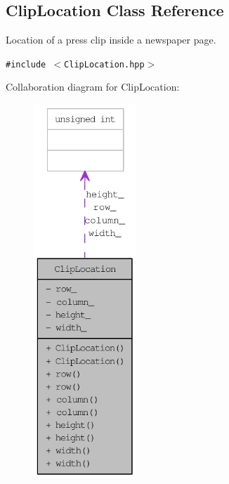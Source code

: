 \hypertarget{class_clip_location}{
\subsection{ClipLocation Class Reference}
\label{class_clip_location}
}
Location of a press clip inside a newspaper page.  


{\tt \#include $<$ClipLocation.hpp$>$}

Collaboration diagram for ClipLocation:\nopagebreak
\begin{figure}[H]
\begin{center}
\leavevmode
\includegraphics[height=400pt]{class_clip_location__coll__graph}
\end{center}
\end{figure}
